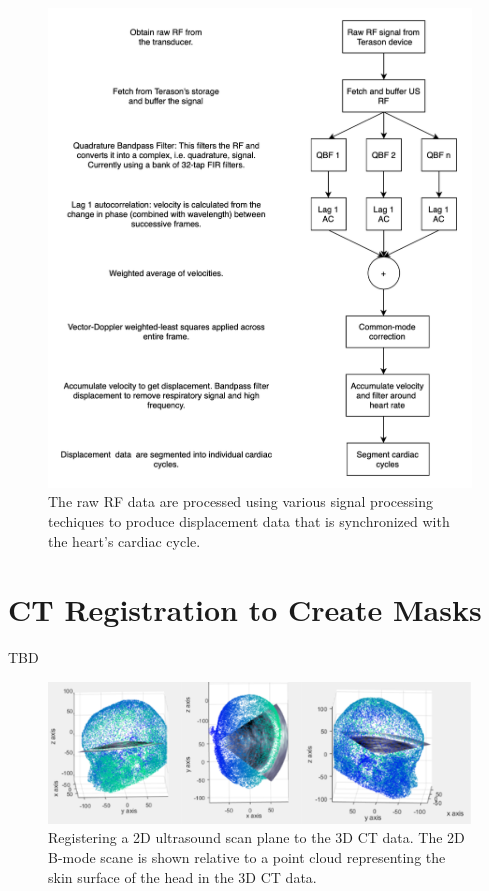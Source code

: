 \documentclass [11pt, proquest] {uwthesis}[2020/02/24]
\begin{document}
\begin{figure}
  \centering
  \includegraphics[width=0.9\linewidth]{figures/signal_processing.png}
  \caption{The raw RF data are processed using various signal processing techiques to produce displacement data that is synchronized 
  with the heart's cardiac cycle.}
  \label{signal_processing}
\end{figure}


\section{CT Registration to Create Masks}

TBD

\begin{figure}
  \centering
  \includegraphics[width=0.9\linewidth]{figures/registration.png}
  \caption{Registering a 2D ultrasound scan plane to the 3D CT data. The 2D B-mode scane is shown relative to a point cloud representing 
  the skin surface of the head in the 3D CT data.}
  \label{registration}
\end{figure}
\end{document}
